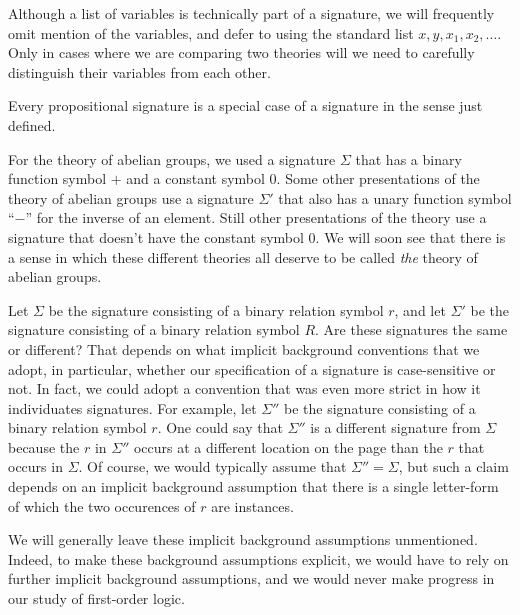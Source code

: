 Although a list of variables is technically part of a signature, we
will frequently omit mention of the variables, and defer to using the
standard list $x,y,x_1,x_2,\dots $.  Only in cases where we are
comparing two theories will we need to carefully distinguish their
variables from each other.

\begin{example} Every propositional signature is a special case of a
  signature in the sense just defined.   \end{example}

\begin{example} For the theory of abelian groups, we used a signature
  $\Sigma$ that has a binary function symbol $+$ and a constant symbol
  $0$.  Some other presentations of the theory of abelian groups use a
  signature $\Sigma '$ that also has a unary function symbol ``$-$''
  for the inverse of an element.  Still other presentations of the
  theory use a signature that doesn't have the constant symbol $0$.
  We will soon see that there is a sense in which these different
  theories all deserve to be called \textit{the} theory of abelian
  groups.  \end{example}

\begin{disc} Let $\Sigma$ be the signature consisting of a binary
  relation symbol $r$, and let $\Sigma '$ be the signature consisting
  of a binary relation symbol $R$.  Are these signatures the same or
  different?  That depends on what implicit background conventions
  that we adopt, in particular, whether our specification of a
  signature is case-sensitive or not.  In fact, we could adopt a
  convention that was even more strict in how it individuates
  signatures.  For example, let $\Sigma ''$ be the signature
  consisting of a binary relation symbol $r$.  One could say that
  $\Sigma ''$ is a different signature from $\Sigma$ because the $r$
  in $\Sigma ''$ occurs at a different location on the page than the
  $r$ that occurs in $\Sigma$.  Of course, we would typically assume
  that $\Sigma ''=\Sigma$, but such a claim depends on an implicit
  background assumption that there is a single letter-form of which
  the two occurences of $r$ are instances.

  We will generally leave these implicit background assumptions
  unmentioned.  Indeed, to make these background assumptions explicit,
  we would have to rely on further implicit background assumptions,
  and we would never make progress in our study of first-order
  logic. 
\end{disc}


